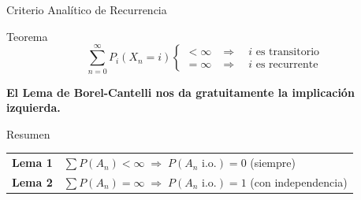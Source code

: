 \documentclass[11pt]{beamer}
\newcommand{\io}{\text{ i.o.}}
\begin{document}
\begin{frame}{Criterio Analítico de Recurrencia}

  \begin{block}{Teorema}
    \[
      \sum_{n=0}^{\infty} P_i(X_n = i)
      \begin{cases}
        < \infty & \Longrightarrow \quad i \text{ es transitorio} \\[6pt]
        = \infty & \Longrightarrow \quad i \text{ es recurrente}
      \end{cases}
    \]
  \end{block}

  \bigskip
  \textbf{El Lema de Borel-Cantelli nos da gratuitamente la implicación izquierda.}

  \bigskip

  \begin{block}{Resumen}
    \begin{center}
    \renewcommand{\arraystretch}{1.4}
    \begin{tabular}{ll}
      \textbf{Lema 1} & $\sum P(A_n) < \infty \;\Rightarrow\; P(A_n \io) = 0$ \quad (siempre) \\
      \textbf{Lema 2} & $\sum P(A_n) = \infty \;\Rightarrow\; P(A_n \io) = 1$ \quad (con independencia)
    \end{tabular}
    \end{center}
  \end{block}

\end{frame}
\end{document}
